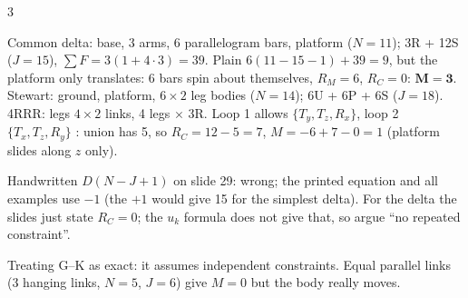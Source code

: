 \begin{multicols}{3}
\begin{worked}
Common delta: base, 3 arms, 6 parallelogram bars, platform ($N=11$); 3R + 12S ($J=15$), $\sum F=3(1+4\cdot3)=39$. Plain $6(11-15-1)+39=9$, but the platform only translates: 6 bars spin about themselves, $R_M=6$, $R_C=0$: $\mathbf{M=3}$.
Stewart: ground, platform, $6\times2$ leg bodies ($N=14$); 6U + 6P + 6S ($J=18$).
4RRR: legs $4\times2$ links, 4 legs $\times$ 3R. Loop 1 allows $\{T_y,T_z,R_x\}$, loop 2 $\{T_x,T_z,R_y\}$ : union has 5, so $R_C=12-5=7$, $M=-6+7-0=1$ (platform slides along $z$ only).
\end{worked}
\begin{slideerr}[slides 29, 35--36]
Handwritten $D(N-J+1)$ on slide 29: wrong; the printed equation and all examples use $-1$ (the $+1$ would give 15 for the simplest delta). For the delta the slides just state $R_C=0$; the $u_k$ formula does not give that, so argue ``no repeated constraint''. \chk
\end{slideerr}
\begin{trap}
Treating G--K as exact: it assumes independent constraints. Equal parallel links (3 hanging links, $N=5$, $J=6$) give $M=0$ but the body really moves.
\end{trap}


\end{multicols}
